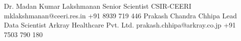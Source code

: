 %
%
%


\begin{referees}
		{Dr. Madan Kumar Lakshmanan}
		{Senior Scientist}
		{CSIR-CEERI}
		{mklakshmanan@ceeri.res.in}
		{+91 8939 719 446}
		{Prakash Chandra Chhipa}
		{Lead Data Scientist}
		{Arkray Healthcare Pvt. Ltd.}
		{prakash.chhipa@arkray.co.jp}
		{+91 7503 790 180}
\end{referees}